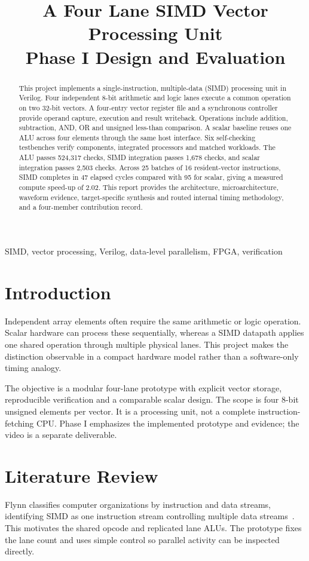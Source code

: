 \documentclass[conference]{IEEEtran}
\title{A Four Lane SIMD Vector Processing Unit\\Phase I Design and Evaluation}
\author{\IEEEauthorblockN{Aanya Mehrotra \quad Vachan Gupta \quad Aditya Srivastava \quad Abhay}}
\begin{document}
\maketitle
\begin{abstract}
This project implements a single-instruction, multiple-data (SIMD) processing unit in Verilog. Four independent 8-bit arithmetic and logic lanes execute a common operation on two 32-bit vectors. A four-entry vector register file and a synchronous controller provide operand capture, execution and result writeback. Operations include addition, subtraction, AND, OR and unsigned less-than comparison. A scalar baseline reuses one ALU across four elements through the same host interface. Six self-checking testbenches verify components, integrated processors and matched workloads. The ALU passes 524,317 checks, SIMD integration passes 1,678 checks, and scalar integration passes 2,503 checks. Across 25 batches of 16 resident-vector instructions, SIMD completes in 47 elapsed cycles compared with 95 for scalar, giving a measured compute speed-up of 2.02. This report provides the architecture, microarchitecture, waveform evidence, target-specific synthesis and routed internal timing methodology, and a four-member contribution record.
\end{abstract}
\begin{IEEEkeywords}
SIMD, vector processing, Verilog, data-level parallelism, FPGA, verification
\end{IEEEkeywords}
\section{Introduction}
Independent array elements often require the same arithmetic or logic operation. Scalar hardware can process these sequentially, whereas a SIMD datapath applies one shared operation through multiple physical lanes. This project makes the distinction observable in a compact hardware model rather than a software-only timing analogy.

The objective is a modular four-lane prototype with explicit vector storage, reproducible verification and a comparable scalar design. The scope is four 8-bit unsigned elements per vector. It is a processing unit, not a complete instruction-fetching CPU. Phase I emphasizes the implemented prototype and evidence; the video is a separate deliverable.

\section{Literature Review}
Flynn classifies computer organizations by instruction and data streams, identifying SIMD as one instruction stream controlling multiple data streams~\cite{flynn}. This motivates the shared opcode and replicated lane ALUs. The prototype fixes the lane count and uses simple control so parallel activity can be inspected directly.
\end{document}
